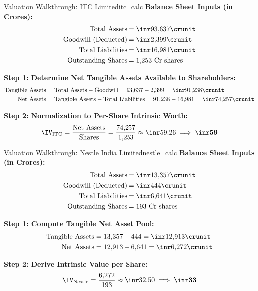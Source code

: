 \begin{example}{Valuation Walkthrough: ITC Limited}{itc_calc}
\textbf{Balance Sheet Inputs (in \inr Crores):}
\begin{align*}
    \text{Total Assets} &= \inr 93{,}637 \crunit \\
    \text{Goodwill (Deducted)} &= \inr 2{,}399 \crunit \\
    \text{Total Liabilities} &= \inr 16{,}981 \crunit \\
    \text{Outstanding Shares} &= 1{,}253 \text{ Cr shares}
\end{align*}

\textbf{Step 1: Determine Net Tangible Assets Available to Shareholders:}
\begin{align*}
    \text{Tangible Assets} &= \text{Total Assets} - \text{Goodwill} = 93{,}637 - 2{,}399 = \inr 91{,}238 \crunit \\
    \text{Net Assets} &= \text{Tangible Assets} - \text{Total Liabilities} = 91{,}238 - 16{,}981 = \inr 74{,}257 \crunit
\end{align*}

\textbf{Step 2: Normalization to Per-Share Intrinsic Worth:}
\begin{equation*}
    \IV_{\text{ITC}} = \frac{\text{Net Assets}}{\text{Shares}} = \frac{74{,}257}{1{,}253} \approx \inr 59.26 \implies \mathbf{\inr 59}
\end{equation*}
\end{example}

\begin{example}{Valuation Walkthrough: Nestle India Limited}{nestle_calc}
\textbf{Balance Sheet Inputs (in \inr Crores):}
\begin{align*}
    \text{Total Assets} &= \inr 13{,}357 \crunit \\
    \text{Goodwill (Deducted)} &= \inr 444 \crunit \\
    \text{Total Liabilities} &= \inr 6{,}641 \crunit \\
    \text{Outstanding Shares} &= 193 \text{ Cr shares}
\end{align*}

\textbf{Step 1: Compute Tangible Net Asset Pool:}
\begin{align*}
    \text{Tangible Assets} &= 13{,}357 - 444 = \inr 12{,}913 \crunit \\
    \text{Net Assets} &= 12{,}913 - 6{,}641 = \inr 6{,}272 \crunit
\end{align*}

\textbf{Step 2: Derive Intrinsic Value per Share:}
\begin{equation*}
    \IV_{\text{Nestle}} = \frac{6{,}272}{193} \approx \inr 32.50 \implies \mathbf{\inr 33}
\end{equation*}
\end{example}

